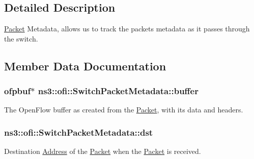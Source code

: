 \subsection{Detailed Description}
\hyperlink{classns3_1_1Packet}{Packet} Metadata, allows us to track the packet\textquotesingle{}s metadata as it passes through the switch. 

\subsection{Member Data Documentation}
\subsubsection[{\texorpdfstring{buffer}{buffer}}]{\setlength{\rightskip}{0pt plus 5cm}ofpbuf$\ast$ ns3\+::ofi\+::\+Switch\+Packet\+Metadata\+::buffer}\hypertarget{structns3_1_1ofi_1_1SwitchPacketMetadata_ac91341e87ea5d60d4909a30bf851c1c2}{}\label{structns3_1_1ofi_1_1SwitchPacketMetadata_ac91341e87ea5d60d4909a30bf851c1c2}


The Open\+Flow buffer as created from the \hyperlink{classns3_1_1Packet}{Packet}, with its data and headers. 

\subsubsection[{\texorpdfstring{dst}{dst}}]{ ns3\+::ofi\+::\+Switch\+Packet\+Metadata\+::dst}\hypertarget{structns3_1_1ofi_1_1SwitchPacketMetadata_ab46bf904a1dddf5258af82f6b2b208a4}{}\label{structns3_1_1ofi_1_1SwitchPacketMetadata_ab46bf904a1dddf5258af82f6b2b208a4}


Destination \hyperlink{classns3_1_1Address}{Address} of the \hyperlink{classns3_1_1Packet}{Packet} when the \hyperlink{classns3_1_1Packet}{Packet} is received. 

